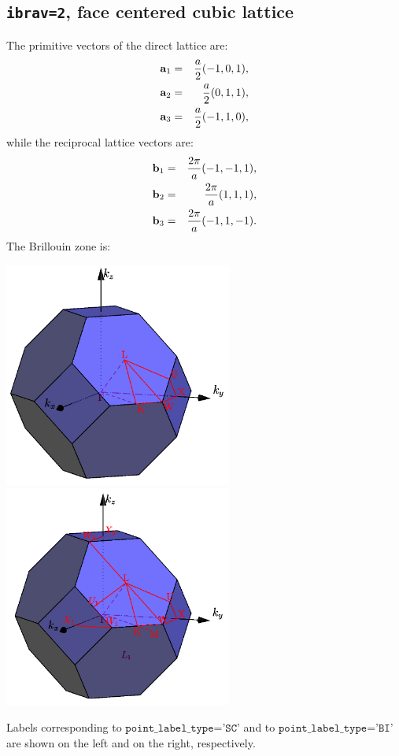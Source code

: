 \documentclass[12pt,a4paper]{article}
\begin{document}
\subsection{\texttt{ibrav=2}, face centered cubic lattice}
The primitive vectors of the direct lattice are:
\begin{eqnarray}
{\bf a}_1 &=& {a \over 2} (-1, 0, 1), \nonumber \\
{\bf a}_2 &=& {a \over 2} (0, 1, 1), \nonumber \\
{\bf a}_3 &=& {a \over 2} (-1, 1, 0), \nonumber
\nonumber
\end{eqnarray}
while the reciprocal lattice vectors are:
\begin{eqnarray}
{\bf b}_1 &=& {2\pi \over a} (-1, -1, 1), \nonumber \\
{\bf b}_2 &=& {2\pi \over a} (1, 1, 1), \nonumber \\
{\bf b}_3 &=& {2\pi \over a} (-1, 1, -1). \nonumber
\nonumber
\end{eqnarray}
The Brillouin zone is:
\begin{center}
\includegraphics[width=7.5cm,angle=0]{images/fcc_sc.png} \hspace{1.cm}
\includegraphics[width=7.5cm,angle=0]{images/fcc_bi.png}
\end{center}
Labels corresponding to $\texttt{point\_label\_type='SC'}$ and to
$\texttt{point\_label\_type='BI'}$ are shown on the left and on the right, 
respectively.
\end{document}
